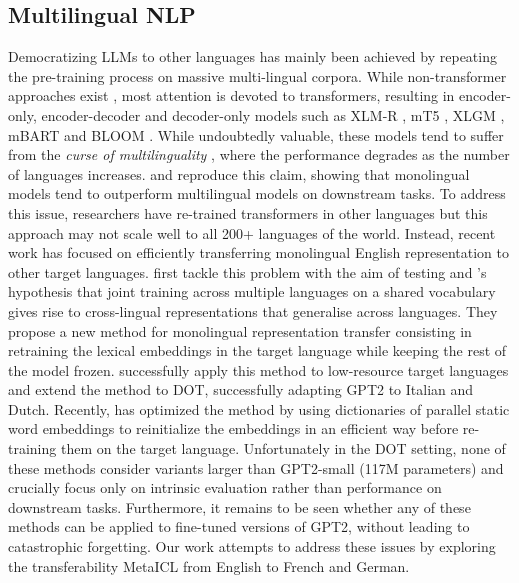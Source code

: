\documentclass[11pt]{article}
\begin{document}
\subsection{Multilingual NLP}

Democratizing LLMs to other languages has mainly been achieved by repeating the pre-training process
on massive multi-lingual corpora. While non-transformer approaches exist
\citep{artetxe_massively_2019}, most attention is devoted to transformers, resulting in
encoder-only, encoder-decoder and decoder-only models such as XLM-R
\citep{conneau_cross-lingual_2019}, mT5 \citep{xue_mt5_2021}, XLGM \citep{lin_few-shot_2021}, mBART
\citep{liu_multilingual_2020} and BLOOM \citep{bigscience_workshop_bloom_2022}. While undoubtedly
valuable, these models tend to suffer from the \textit{curse of multilinguality}
\citep{conneau_unsupervised_2020}, where the performance degrades as the number of languages
increases. \citet{nozza_what_2020} and \citet{wu_are_2020} reproduce this claim, showing that
monolingual models tend to outperform multilingual models on downstream tasks. To address this
issue, researchers have re-trained transformers in other languages
\citep{martin_camembert_2020,de_vries_bertje_2019,chan_germans_2020, de_mattei_geppetto_2020} but
this approach may not scale well to all 200+ languages of the world. Instead, recent work has
focused on efficiently transferring monolingual English representation to other target languages.
\citet{artetxe_cross-lingual_2020} first tackle this problem with the aim of testing
\citet{pires_how_2019} and \citet{cao_multilingual_2022}'s hypothesis that joint training across
multiple languages on a shared vocabulary gives rise to cross-lingual representations that
generalise across languages. They propose a new method for monolingual representation transfer
consisting in retraining the lexical embeddings in the target language while keeping the rest of the
model frozen. \citet{de_vries_adapting_2021} successfully apply this method to low-resource target
languages and \citet{de_vries_as_2021} extend the method to DOT, successfully adapting GPT2 to
Italian and Dutch. Recently, \citet{minixhofer_wechsel_2022} has optimized the method by using
dictionaries of parallel static word embeddings to reinitialize the embeddings in an efficient way
before re-training them on the target language. Unfortunately in the DOT setting, none of these
methods consider variants larger than GPT2-small (117M parameters) and crucially focus only on
intrinsic evaluation rather than performance on downstream tasks. Furthermore, it remains to be seen
whether any of these methods can be applied to fine-tuned versions of GPT2, without leading to
catastrophic forgetting. Our work attempts to address these issues by exploring the transferability
MetaICL \citep{min_metaicl_2022} from English to French and German.
\end{document}
